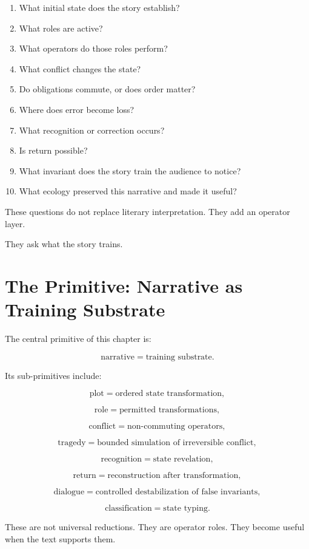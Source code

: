 \documentclass[11pt]{book}
\begin{document}
\begin{enumerate}[label=\arabic*.]
    \item What initial state does the story establish?
    \item What roles are active?
    \item What operators do those roles perform?
    \item What conflict changes the state?
    \item Do obligations commute, or does order matter?
    \item Where does error become loss?
    \item What recognition or correction occurs?
    \item Is return possible?
    \item What invariant does the story train the audience to notice?
    \item What ecology preserved this narrative and made it useful?
\end{enumerate}

These questions do not replace literary interpretation. They add an operator layer.

They ask what the story trains.

\section{The Primitive: Narrative as Training Substrate}

The central primitive of this chapter is:

\[
\text{narrative} = \text{training substrate}.
\]

Its sub-primitives include:

\[
\text{plot} = \text{ordered state transformation},
\]

\[
\text{role} = \text{permitted transformations},
\]

\[
\text{conflict} = \text{non-commuting operators},
\]

\[
\text{tragedy} = \text{bounded simulation of irreversible conflict},
\]

\[
\text{recognition} = \text{state revelation},
\]

\[
\text{return} = \text{reconstruction after transformation},
\]

\[
\text{dialogue} = \text{controlled destabilization of false invariants},
\]

\[
\text{classification} = \text{state typing}.
\]

These are not universal reductions. They are operator roles. They become useful when the text supports them.
\end{document}
